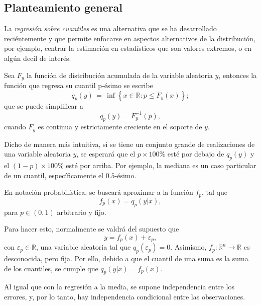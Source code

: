 \subsection{Planteamiento general}

La \textit{regresi\'on sobre cuantiles} es una alternativa que se ha desarrollado reci\'entemente y que permite enfocarse en aspectos alternativos de la distribuci\'on, por ejemplo, centrar la estimaci\'on en estad\'isticos que son valores extremos, o en alg\'un decil de inter\'es. 

\begin{defin}
Sea $F_y$ la funci\'on de distribuci\'on acumulada de la variable aleatoria $y$, entonces la funci\'on que regresa su cuantil p-\'esimo se escribe
\begin{equation*}
    q_p(y)\,=\,\inf \left\{x\in {\mathbb  {R}}:p\leq F_y(x)\right\};
\end{equation*}
que se puede simplificar a
\begin{equation*}
    q_p(y)=F_y^{-1}(p),
\end{equation*}
cuando $F_y$ es continua y estrictamente creciente en el soporte de $y$.
\end{defin}
Dicho de manera m\'as intuitiva, si se tiene un conjunto grande de realizaciones de una variable aleatoria $y$, se esperar\'a que el $p \times 100\%$ est\'e por debajo de $q_p(y)$ y el $(1-p) \times 100\%$ est\'e por arriba. Por ejemplo, la mediana es un caso particular de un cuantil, espec\'ificamente el $0.5$-\'esimo. 

En notaci\'on probabil\'istica, se buscar\'a aproximar a la funci\'on $f_p$, tal que 
\begin{equation*}
    f_p(x) = q_p(y|x),
\end{equation*}
para $p \in (0,1)$ arbitrario y fijo.

Para hacer esto, normalmente se valdr\'a del supuesto que
\begin{equation*}
    y = f_p(x) + \varepsilon_p,
\end{equation*}
con $\varepsilon_p \in \mathbb{R}$, una variable aleatoria tal que $q_p(\varepsilon_p) = 0$. Asimismo, $f_p: \mathbb{R}^n \rightarrow \mathbb{R}$ es desconocida, pero fija. Por ello, debido a que el cuantil de una suma es la suma de los cuantiles, se cumple que $q_p(y|x) = f_p(x)$.

Al igual que con la regresi\'on a la media, se supone independencia entre los errores, y, por lo tanto, hay independencia condicional entre las observaciones.

